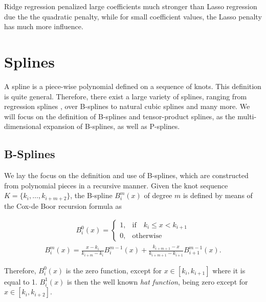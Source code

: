 \documentclass[10pt,a4paper]{report}
\begin{document}
Ridge regression penalized large coefficients much stronger than Lasso regression due the the quadratic penalty, while for small coefficient values, the Lasso penalty has much more influence. \cite{tibshirani1996lasso}

\section{Splines} \label{sec:Splines}
	
A spline is a piece-wise polynomial defined on a sequence of knots. This definition is quite general. Therefore, there exist a large variety of splines, ranging from regression splines \cite{eubank1990regressionsplines}, over B-splines \cite{deBoor1978practicalGuideToSplines} to natural cubic splines and many more. We will focus on the definition of B-splines and tensor-product splines, as the multi-dimensional expansion of B-splines, as well as P-splines. \cite{deBoor1978practicalGuideToSplines} \cite{eilers1996flexible}
\subsection{B-Splines}

We lay the focus on the definition and use of B-splines, which are constructed from polynomial pieces in a recursive manner. Given the knot sequence $K = \{k_i, \dots, k_{i+m+2}\}$,  the B-spline $B_i^m(x)$ of degree $m$ is defined by means of the Cox-de Boor recursion formula as

\begin{align} \label{eq:Bspline_recDef1}
	B_i^0(x) = \begin{cases} 1, & \text{if} \quad k_i \le x < k_{i+1} \\ 
					 		 0, & \text{otherwise} 
	\end{cases}
\end{align}
\begin{align} \label{eq:Bspline_recDef2}
	B_i^m(x) = \frac{x - k_i}{k_{i+m} - k_i} B_i^{m-1}(x) + \frac{k_{i+m+1} - x}{k_{i+m+1} - k_{i+1}} B_{i+1}^{m-1}(x).
\end{align}

Therefore, $B_i^0(x)$ is the zero function, except for $x \in [k_i, k_{i+1}]$ where it is equal to 1. $B_i^1(x)$ is then the well known \emph{hat function}, being zero except for $x \in [k_i, k_{i+2}]$. 
\end{document}
